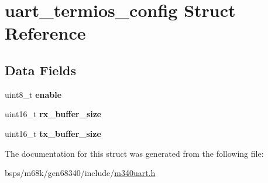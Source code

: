 \hypertarget{structuart__termios__config}{}\section{uart\+\_\+termios\+\_\+config Struct Reference}
\label{structuart__termios__config}
\subsection*{Data Fields}
\begin{DoxyCompactItemize}
\item 
\mbox{\label{structuart__termios__config_a7c8f2806b82cd199a6b91f28dec122af}} 
uint8\+\_\+t {\bfseries enable}
\item 
\mbox{\label{structuart__termios__config_a6c6bfe890ca54bee057dffdeae5c0c5e}} 
uint16\+\_\+t {\bfseries rx\+\_\+buffer\+\_\+size}
\item 
\mbox{\label{structuart__termios__config_a4a96d4a01550ca0ee00aafd341d4fc7f}} 
uint16\+\_\+t {\bfseries tx\+\_\+buffer\+\_\+size}
\end{DoxyCompactItemize}


The documentation for this struct was generated from the following file\+:\begin{DoxyCompactItemize}
\item 
bsps/m68k/gen68340/include/\mbox{\hyperlink{m340uart_8h}{m340uart.\+h}}\end{DoxyCompactItemize}
